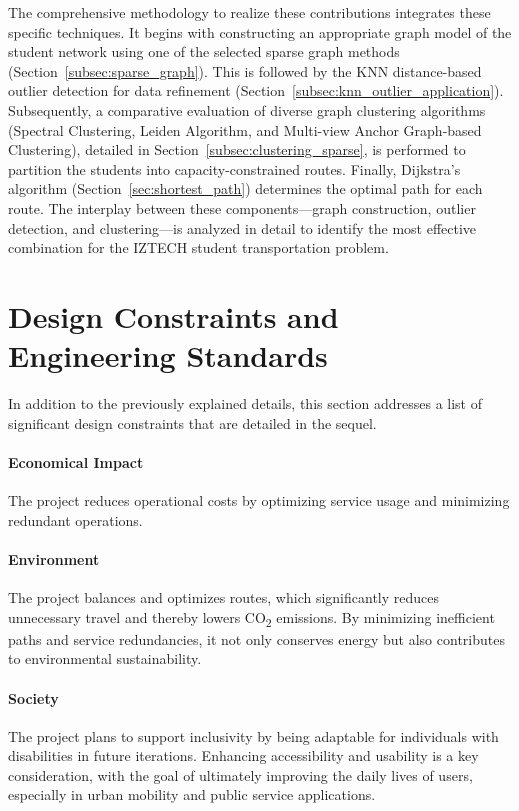 The comprehensive methodology to realize these contributions integrates these specific techniques. It begins with constructing an appropriate graph model of the student network using one of the selected sparse graph methods (Section~\ref{subsec:sparse_graph}). This is followed by the KNN distance-based outlier detection for data refinement (Section~\ref{subsec:knn_outlier_application}). Subsequently, a comparative evaluation of diverse graph clustering algorithms (Spectral Clustering, Leiden Algorithm, and Multi-view Anchor Graph-based Clustering), detailed in Section~\ref{subsec:clustering_sparse}, is performed to partition the students into capacity-constrained routes. Finally, Dijkstra's algorithm (Section~\ref{sec:shortest_path}) determines the optimal path for each route. The interplay between these components—graph construction, outlier detection, and clustering—is analyzed in detail to identify the most effective combination for the IZTECH student transportation problem.

\section{Design Constraints and Engineering Standards}
\label{sec:design_constraints}
In addition to the previously explained details, this section addresses a list of significant design constraints that are detailed in the sequel.

\paragraph{Economical Impact} The project reduces operational costs by optimizing service usage and minimizing redundant operations.

\paragraph{Environment} The project balances and optimizes routes, which significantly reduces unnecessary travel and thereby lowers CO\textsubscript{2} emissions. By minimizing inefficient paths and service redundancies, it not only conserves energy but also contributes to environmental sustainability.

\paragraph{Society} The project plans to support inclusivity by being adaptable for individuals with disabilities in future iterations. Enhancing accessibility and usability is a key consideration, with the goal of ultimately improving the daily lives of users, especially in urban mobility and public service applications.

